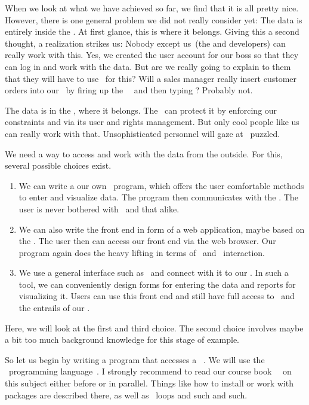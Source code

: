 %
%
\label{sec:factoryFromPython}%
%
When we look at what we have achieved so far, we find that it is all pretty nice.
However, there is one general problem we did not really consider yet:
The data is entirely inside the \db.
At first glance, this is where it belongs.
Giving this a second thought, a realization strikes us:
Nobody except us~(the  and developers) can really work with this.
Yes, we created the user account  for our boss so that they can log in and work with the data.
But are we really going to explain to them that they will have to use \sql\ for this?
Will a sales manager really insert customer orders into our \db\ by firing up the \sql\ \client\ and then typing ?
Probably not.

The data is in the \db, where it belongs.
The \dbms\ can protect it by enforcing our constraints and via its user and rights management.
But only cool people like us can really work with that.
Unsophisticated personnel will gaze at \psql\ puzzled.

We need a way to access and work with the data from the outside.
For this, several possible choices exist.%
%
\begin{enumerate}%
%
\item We can write a our own \client\ program, which offers the user comfortable methods to enter and visualize data.
The program then communicates with the \db.
The user is never bothered with \sql\ and that alike.%
%
\item We can also write the front end in form of a web application, maybe based on the  \server.
The user then can access our front end via the web browser.
Our program again does the heavy lifting in terms of \sql\ and \db\ interaction.%
%
\item We use a general interface such as \libreofficeBase\ and connect with it to our \db.
In such a tool, we can conveniently design forms for entering the data and reports for visualizing it.
Users can use this front end and still have full access to \sql\ and the entrails of our \db.%
%
\end{enumerate}%
%
Here, we will look at the first and third choice.
The second choice involves maybe a bit too much background knowledge for this stage of  example.

So let us begin by writing a program that accesses a \postgresql\ \db.
We will use the \python\ programming language~\cite{programmingWithPython}.
I strongly recommend to read our course book~~\cite{programmingWithPython} on this subject either before or in parallel.
Things like how to install or work with packages are described there, as well as ~loops and such and such.

